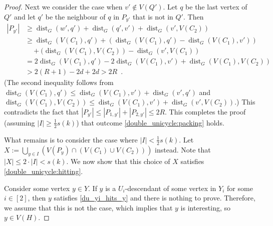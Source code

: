 \documentclass{patmorin}
\newcommand{\gwen}[1]{\textcolor{Purple}{Gwen: #1}}
\newcommand{\piotr}[1]{\textcolor{red}{Piotr: #1}}
\DeclareMathOperator{\dist}{dist}
\begin{document}
\begin{proof}
    Next we consider the case when $v'\notin V(Q')$. 
    Let $q$ be the last vertex of $Q'$ and let $q'$ be the neighbour of $q$ in $P_{y'}$ that is not in $Q'$.  Then
    \begin{align*}
    |P_{y'}| 
        & \ge \dist_G(w',q') + \dist_G(q',v') + \dist_G(v',V(C_2)) \\
        & \ge \dist_G(V(C_1),q') + (\dist_G(V(C_1),q') - \dist_G(V(C_1),v')) \\
        & \quad {} + (\dist_G(V(C_1),V(C_2))-\dist_G(v',V(C_1)) \\
        & = 2\dist_G(V(C_1),q') - 2\dist_G(V(C_1),v') + \dist_G(V(C_1),V(C_2)) \\
        & > 2(R+1) - 2d + 2d > 2R \enspace .
    \end{align*}
    (The second inequality follows from $\dist_G(V(C_1),q')\leq \dist_G(V(C_1),v')+\dist_G(v',q')$ and
    $\dist_G(V(C_1),V(C_2))\le \dist_G(V(C_1),v')+\dist_G(v',V(C_2))$.) This contradicts the fact that $|P_{y'}|\le |P_{1,y'}|+|P_{2,y'}|\le 2R$.  This completes the proof (assuming $|I|\ge\tfrac{1}{2}s(k)$) that outcome \cref{double_unicycle:packing} holds.


    What remains is to consider the case where $|I|<\frac{1}{2}s(k)$.  Let $X:=\bigcup_{y\in I}\left( V(P_y)\cap(V(C_1)\cup V(C_2))\right)$ instead. 
    Note that $|X|\leq 2\cdot|I| < s(k)$. 
    We now show that this choice of $X$ satisfies \cref{double_unicycle:hitting}.

    Consider some vertex $y\in Y$.  If $y$ is a $U_i$-descendant of some vertex in $Y_i$ for some $i\in[2]$, then $y$ satisfies \cref{du_yi_hits_y} and there is nothing to prove.  Therefore, we assume that this is not the case, which implies that $y$ is interesting, so $y\in V(H)$.


\end{proof}
\end{document}
